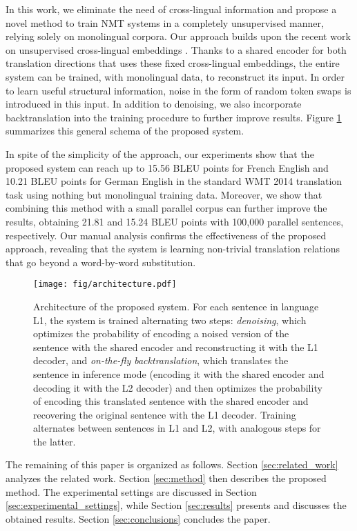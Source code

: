 \documentclass{article} \usepackage{iclr2018_conference,times}
\begin{document}
In this work, we eliminate the need of cross-lingual information and propose a novel method to train NMT systems in a completely unsupervised manner, relying solely on monolingual corpora. Our approach builds upon the recent work on unsupervised cross-lingual embeddings \citep{artetxe2017learning,zhang2017adversarial}. Thanks to a shared encoder for both translation directions that uses these fixed cross-lingual embeddings, the entire system can be trained, with monolingual data, to reconstruct its input. In order to learn useful structural information, noise in the form of random token swaps is introduced in this input. In addition to denoising, we also incorporate backtranslation \citep{sennrich2016improving} into the training procedure to further improve results. Figure \ref{fig:architecture} summarizes this general schema of the proposed system.

In spite of the simplicity of the approach, our experiments show that the proposed system can reach up to 15.56 BLEU points for French  English and 10.21 BLEU points for German  English in the standard WMT 2014 translation task using nothing but monolingual training data. Moreover, we show that combining this method with a small parallel corpus
can further improve the results, obtaining 21.81 and 15.24 BLEU points with 100,000 parallel sentences, respectively. Our manual analysis confirms the effectiveness of the proposed approach, revealing that the system is learning non-trivial translation relations that go beyond a word-by-word substitution.

\begin{figure}[t] \centering
\texttt{[image: fig/architecture.pdf]}
\caption{Architecture of the proposed system. For each sentence in language L1, the system is trained alternating two steps: \textit{denoising}, which optimizes the probability of encoding a noised version of the sentence with the shared encoder and reconstructing it with the L1 decoder, and \textit{on-the-fly backtranslation}, which translates the sentence in inference mode (encoding it with the shared encoder and decoding it with the L2 decoder) and then optimizes the probability of encoding this translated sentence with the shared encoder and recovering the original sentence with the L1 decoder. Training alternates between sentences in L1 and L2, with analogous steps for the latter.}
\label{fig:architecture}
\end{figure}

The remaining of this paper is organized as follows. Section \ref{sec:related_work} analyzes the related work. Section \ref{sec:method} then describes the proposed method. The experimental settings are discussed in Section \ref{sec:experimental_settings}, while Section \ref{sec:results} presents and discusses the obtained results. Section \ref{sec:conclusions} concludes the paper.
\end{document}
